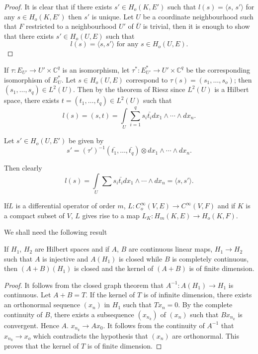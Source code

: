 \begin{proof}
  It is clear that if there exists $s' \in H_o (K, E')$ such
  that $l(s) = \langle s$, $s' \rangle $ for any $s \in H_o (K, E')$
  then $s'$ is unique. Let $U$ be a coordinate neighbourhood such that
  $F$ restricted to a neighbourhood $U'$ of $\bar{U}$ is trivial, then
  it is enough to show that there exists $s' \in H_o (U, E)$ such that 
  $$
  l(s) =  \langle s,s' \rangle \text{ for any } s \in H_o (U, E).
  $$
\end{proof}

If $\tau : E_{U'} \to U' \times \mathbb{C}^q$ is an isomorphism, let
$\tau^* : E^*_{U'} \to U' \times \mathbb{C}^q$ be the corresponding
isomorphism of $E^*_{U}$. Let $s \in H_o (U, E)$ correspond to $\tau
(s) = (s_1 , \ldots , s_o)$; then $(s_1, \ldots , s_q) \in L^2
(U)$. Then by the theorem of Riesz since $L^2 (U)$ is a Hilbert space,
there exists $t = (t_1, \ldots , t_q) \in L^2 (U)$ such that 
$$
l(s) = (s, t) = \int\limits_{U} \sum_{i=1}^{q} s_i \bar{t_i} dx_1
\wedge \cdots \wedge dx_n. 
$$

Let $s' \in H_o (U, E')$ be given by
$$
s' = (\tau')^{-1} (\bar{t_1}, \ldots , \bar{t_q}) \otimes dx_1 \wedge
\cdots \wedge dx_n. 
$$

Then clearly
$$
l(s) = \int\limits_{U} \sum s_i \bar{t_i} dx_1 \wedge \cdots \wedge dx_n =
\langle s, s' \rangle. 
$$

\begin{remark*}%
  If\pageoriginale $L$ is a differential operator of order $m$, $L: C^{\infty}_o
  (V, E) \to C^{\infty} (V, F)$ and if $K$ is a compact subset of $V$,
  $L$ gives rise to a map $L_K : H_m (K, E) \to H_o (K,F)$. 
\end{remark*}

We shall need the following result

\setcounter{theorem}{0}
\begin{theorem}\label{chap3:sec9:thm1} %
  If $H_1$, $H_2$ are Hilbert spaces and if $A$, $B$ are continuous
  linear maps, $H_1 \to H_2$ such that $A$ is injective and $A(H_1)$
  is closed while  $B$ is completely continuous, then $(A+B) (H_1)$ is
  closed and the kernel of $(A+B)$  is of finite dimension. 
\end{theorem}

\begin{proof}
  It follows from the closed graph theorem that $A^{-1}: A (H_1) \to
  H_1$ is continuous. Let $A + B = T$. If the kernel of $T$ is of
  infinite  dimension, there exists an orthonormal sequence $(x_n)$ in
  $H_1$ such that $Tx_n = 0$. By the complete continuity of $B$, there
  exists a subsequence $(x_{n_{k}})$ of $(x_n)$ such that $Bx_{n_{k}}$
  is convergent. Hence $A$. $x_{n_{k}} \to Ax_0$. It follows from the
  continuity of $A^{-1}$ that $x_{n_{k}} \to x_o$ which contradicts
  the hypothesis that $(x_n)$ are orthonormal. This proves that the
  kernel of $T$ is of finite dimension. 
\end{proof}

